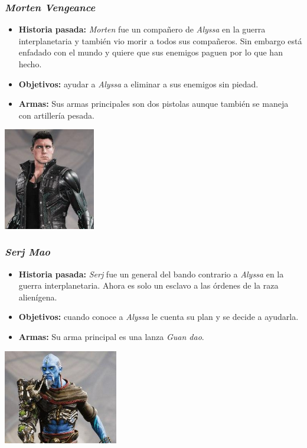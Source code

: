 \documentclass[11pt, twoside]{article}
\begin{document}
\subsubsection{\textit{Morten Vengeance}}
\begin{itemize}
\item \textbf{Historia pasada:} \textit{Morten} fue un compañero de \textit{Alyssa} en la guerra interplanetaria y también vio morir a todos sus compañeros. Sin embargo está enfadado con el mundo y quiere que sus enemigos paguen por lo que han hecho. 
\item \textbf{Objetivos:} ayudar a \textit{Alyssa} a eliminar a sus enemigos sin piedad. 
\item \textbf{Armas:} Sus armas principales son dos pistolas aunque también se maneja con artillería pesada. 
\end{itemize}

\begin{center}
\includegraphics[width=4cm]{./images/morten.jpg}
\end{center}

\subsubsection{\textit{Serj Mao}}
\begin{itemize}
\item \textbf{Historia pasada:} \textit{Serj} fue un general del bando contrario a \textit{Alyssa} en la guerra interplanetaria. Ahora es solo un esclavo a las órdenes de la raza alienígena.
\item \textbf{Objetivos:} cuando conoce a \textit{Alyssa} le cuenta su plan y se decide a ayudarla. 
\item \textbf{Armas:} Su arma principal es una lanza \textit{Guan dao}.
\end{itemize}

\pagestyle{notsection}

\begin{center}
\includegraphics[width=5cm]{./images/serj.jpg}
\end{center}
\end{document}
